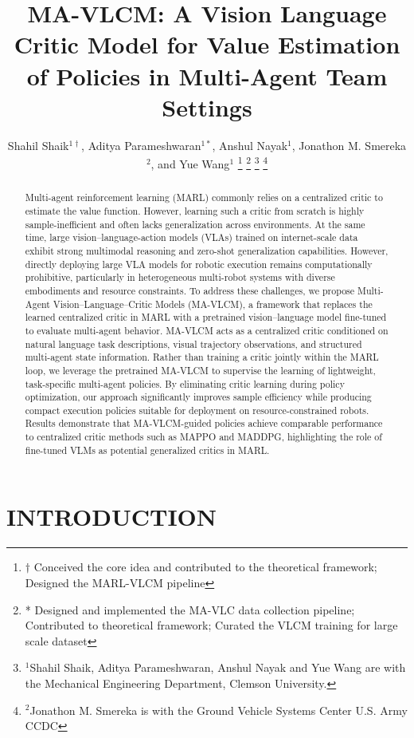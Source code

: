 \documentclass[letterpaper, 10 pt, conference]{ieeeconf}  %
\title{\LARGE \bf
  MA-VLCM: A Vision Language Critic Model for Value Estimation of Policies in Multi-Agent Team Settings
}
\author{Shahil Shaik$^{1\dagger}$, Aditya Parameshwaran$^{1*}$, Anshul Nayak$^{1}$, Jonathon M. Smereka$^{2}$, and Yue Wang$^{1}$%
  \thanks{$\dagger$ Conceived the core idea and contributed to the theoretical framework; Designed the MARL-VLCM pipeline}%
  \thanks{* Designed and implemented the MA-VLC data collection pipeline; Contributed to theoretical framework; Curated the VLCM training for large scale dataset}%
  \thanks{$^{1}$Shahil Shaik, Aditya Parameshwaran, Anshul Nayak and Yue Wang are with the Mechanical Engineering
    Department, Clemson University.}%
  \thanks{$^{2}$Jonathon M. Smereka is with the Ground
    Vehicle Systems Center U.S. Army CCDC}%
}
\begin{document}
\maketitle
\thispagestyle{empty}
\pagestyle{empty}


\begin{abstract}
Multi-agent reinforcement learning (MARL) commonly relies on a centralized critic to estimate the value function. However, learning such a critic from scratch is highly sample-inefficient and often lacks generalization across environments. At the same time, large vision–language-action models (VLAs) trained on internet-scale data exhibit strong multimodal reasoning and zero-shot generalization capabilities. However, directly deploying large VLA models for robotic execution remains computationally prohibitive, particularly in heterogeneous multi-robot systems with diverse embodiments and resource constraints.
To address these challenges, we propose Multi-Agent Vision–Language–Critic Models (MA-VLCM), a framework that replaces the learned centralized critic in MARL with a pretrained vision–language model fine-tuned to evaluate multi-agent behavior. MA-VLCM acts as a centralized critic conditioned on natural language task descriptions, visual trajectory observations, and structured multi-agent state information. Rather than training a critic jointly within the MARL loop, we leverage the pretrained MA-VLCM to supervise the learning of lightweight, task-specific multi-agent policies. By eliminating critic learning during policy optimization, our approach significantly improves sample efficiency while producing compact execution policies suitable for deployment on resource-constrained robots. Results demonstrate that MA-VLCM-guided policies achieve comparable performance to centralized critic methods such as MAPPO and MADDPG, highlighting the role of fine-tuned VLMs as potential generalized critics in MARL.


\end{abstract}

\section{INTRODUCTION}

\end{document}
